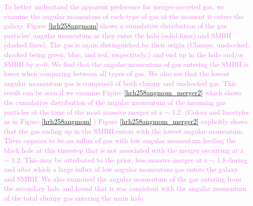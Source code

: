 \documentclass[manuscript]{aastex}
\begin{document}


\textcolor{violet}{
To better understand the apparent preference for merger-accreted gas, we examine the angular momentum of each type of gas at the moment it enters the galaxy. Figure \ref{hrh258angmom} shows a cumulative distribution of the gas particles' angular momentum as they enter the halo (solid lines) and SMBH (dashed lines). The gas is again distinguished by their origin (Clumpy, unshocked, shocked being green, blue, and red, respectively.) and end up in the halo and/or SMBH by z=0. We find that the angular momentum of gas entering the SMBH is lower when comparing between all types of gas. We also see that the lowest angular momentum gas is comprised of both clumpy and unshocked gas. This result can be seen if we examine Figure \ref{hrh258angmom_merger2} which shows the cumulative distribution of the angular momentum of the incoming gas particles at the time of the most massive merger at z $\sim$ 1.2. (Colors and linestyles as in Figure \ref{hrh258angmom}.) Figure \ref{hrh258angmom_merger2} explicitly shows that the gas ending up in the SMBH enters with the lowest angular momentum. There appears to be an influx of gas with low angular momentum feeding the black hole at this timestep that is not associated with the merger occurring at z $\sim$ 1.2. This may be attributed to the prior, less massive merger at z $\sim$ 1.8 during and after which a large influx of low angular momentum gas enters the galaxy and SMBH. We also examined the angular momentum of the gas entering from the secondary halo and found that it was consistent with the angular momentum of the total clumpy gas entering the main halo. 
}

\end{document}
